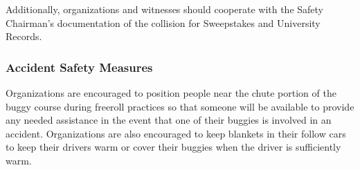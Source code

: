 	Additionally, organizations and witnesses should cooperate with the Safety Chairman's documentation of the collision for Sweepstakes and University Records.

	\subsubsection{Accident Safety Measures}
	Organizations are encouraged to position people near the chute portion of the buggy course during freeroll practices so that someone will be available to provide any needed assistance in the event that one of their buggies is involved in an accident.
	Organizations are also encouraged to keep blankets in their follow cars to keep their drivers warm or cover their buggies when the driver is sufficiently warm.

